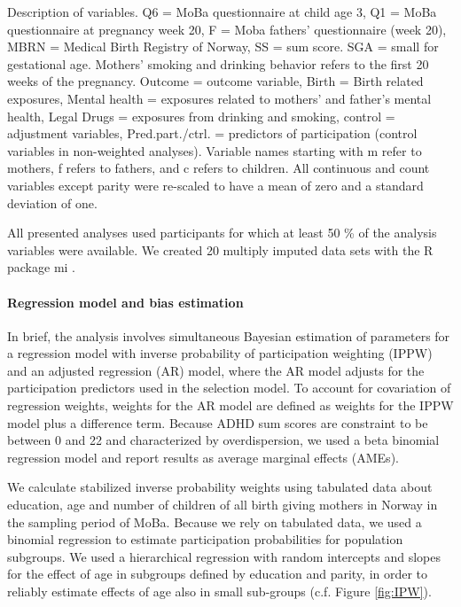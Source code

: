 \documentclass[12pt]{article}
\begin{document}
\begin{table}[ht]
	\centering
	\caption{Description of variables.
		\newline Q6 = MoBa questionnaire at child age 3, Q1 =  MoBa questionnaire at pregnancy week 20, F = Moba fathers' questionnaire (week 20), MBRN = Medical Birth Registry of Norway, SS = sum score. SGA = small for gestational age. Mothers' smoking and drinking behavior refers to the first 20 weeks of the pregnancy. 
		\newline Outcome = outcome variable, Birth = Birth related exposures, Mental health = exposures related to mothers' and father's mental health, Legal Drugs = exposures from drinking and smoking, control = adjustment variables, Pred.part./ctrl. = predictors of participation (control variables in non-weighted analyses).
		Variable names starting with m refer to mothers, f refers to fathers, and c refers to children. All continuous and count variables except parity were re-scaled to have a mean of zero and a standard deviation of one.} 
	\label{table:variables}
\end{table}


All presented analyses used participants for which at least 50 \% of the analysis variables were available. We created 20 multiply imputed data sets with the R package mi \cite{Su2011-he}. 

\paragraph{Regression model and bias estimation}

In brief, the analysis involves simultaneous Bayesian estimation of parameters for a regression model with inverse probability of participation weighting (IPPW) and an adjusted regression (AR) model, where the AR model adjusts for the participation predictors used in the selection model. To account for covariation of regression weights, weights for the AR model are defined as  weights for the IPPW model plus a difference term. Because ADHD sum scores are constraint to be between 0 and 22 and characterized by overdispersion, we used a beta binomial regression model and report results as average marginal effects (AMEs). 


We calculate stabilized inverse probability weights using tabulated data about education, age and number of children of all birth giving mothers in Norway in the sampling period of MoBa. Because we rely on tabulated data, we used a binomial regression to estimate participation probabilities for population subgroups. We used a hierarchical regression with random intercepts and slopes for the effect of age in subgroups defined by education and parity, in order to reliably estimate effects of age also in small sub-groups (c.f. Figure \ref{fig:IPW}).
\end{document}
